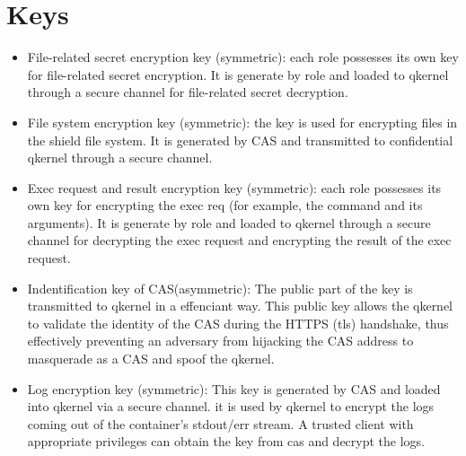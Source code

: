 \section{Keys}

\begin{itemize}
    \item  File-related secret encryption key (symmetric): each role possesses its own key for file-related secret encryption. It is generate by role and loaded to qkernel through a secure channel for file-related secret decryption.
    \item  File system encryption key (symmetric): the key is used for encrypting files in the shield file system. It is generated by CAS and transmitted to confidential qkernel through a secure channel.
    \item  Exec request and result encryption key (symmetric): each role possesses its own key for encrypting the exec req (for example, the command and its arguments).  It is generate by role and loaded to qkernel through a secure channel for decrypting the exec request and encrypting the result of the exec request.
    \item  Indentification key of CAS(asymmetric): The public part of the key is transmitted to qkernel in a effenciant way.  This public key allows the qkernel to validate the identity of the CAS during the HTTPS (tls) handshake, thus effectively preventing an adversary from hijacking the CAS address to masquerade as a CAS and spoof the qkernel.
    \item  Log encryption key (symmetric): This key is generated by CAS and loaded into qkernel via a secure channel. it is used by qkernel to encrypt the logs coming out of the container's stdout/err stream. A trusted client with appropriate privileges can obtain the key from cas and decrypt the logs.
\end{itemize}
\cleardoublepage

